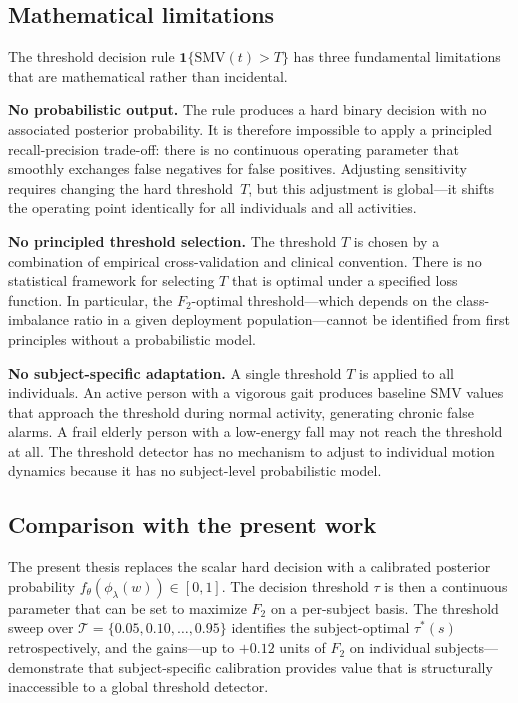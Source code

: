 \subsection{Mathematical limitations}

The threshold decision rule $\mathbf{1}\{\mathrm{SMV}(t) > T\}$ has three
fundamental limitations that are mathematical rather than incidental.

\textbf{No probabilistic output.}  The rule produces a hard binary decision with
no associated posterior probability.  It is therefore impossible to apply a
principled recall-precision trade-off: there is no continuous operating parameter
that smoothly exchanges false negatives for false positives.  Adjusting sensitivity
requires changing the hard threshold~$T$, but this adjustment is global---it shifts
the operating point identically for all individuals and all activities.

\textbf{No principled threshold selection.}  The threshold $T$ is chosen by a
combination of empirical cross-validation and clinical convention.  There is no
statistical framework for selecting $T$ that is optimal under a specified loss
function.  In particular, the $F_2$-optimal threshold---which depends on the
class-imbalance ratio in a given deployment population---cannot be identified from
first principles without a probabilistic model.

\textbf{No subject-specific adaptation.}  A single threshold $T$ is applied to all
individuals.  An active person with a vigorous gait produces baseline $\mathrm{SMV}$
values that approach the threshold during normal activity, generating chronic false
alarms.  A frail elderly person with a low-energy fall may not reach the threshold
at all.  The threshold detector has no mechanism to adjust to individual motion
dynamics because it has no subject-level probabilistic model.

\subsection{Comparison with the present work}

The present thesis replaces the scalar hard decision with a calibrated posterior
probability $f_\theta(\phi_\lambda(w)) \in [0,1]$.  The decision threshold $\tau$
is then a continuous parameter that can be set to maximize $F_2$ on a per-subject
basis.  The threshold sweep over
$\mathcal{T}=\{0.05,0.10,\ldots,0.95\}$ identifies the subject-optimal $\tau^*(s)$
retrospectively, and the gains---up to $+0.12$ units of $F_2$ on individual
subjects---demonstrate that subject-specific calibration provides value that is
structurally inaccessible to a global threshold detector.

